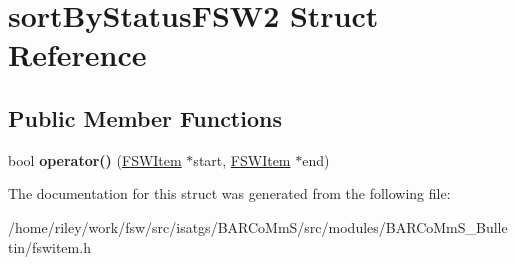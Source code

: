\hypertarget{structsort_by_status_f_s_w2}{}\section{sort\+By\+Status\+F\+S\+W2 Struct Reference}
\label{structsort_by_status_f_s_w2}
\subsection*{Public Member Functions}
\begin{DoxyCompactItemize}
\item 
bool {\bfseries operator()} (\hyperlink{class_f_s_w_item}{F\+S\+W\+Item} $\ast$start, \hyperlink{class_f_s_w_item}{F\+S\+W\+Item} $\ast$end)\hypertarget{structsort_by_status_f_s_w2_a83f2251fe6e6f3cf6d791a1cb46a611d}{}\label{structsort_by_status_f_s_w2_a83f2251fe6e6f3cf6d791a1cb46a611d}

\end{DoxyCompactItemize}


The documentation for this struct was generated from the following file\+:\begin{DoxyCompactItemize}
\item 
/home/riley/work/fsw/src/isatgs/\+B\+A\+R\+Co\+Mm\+S/src/modules/\+B\+A\+R\+Co\+Mm\+S\+\_\+\+Bulletin/fswitem.\+h\end{DoxyCompactItemize}

